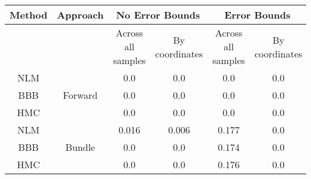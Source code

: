 \documentclass[convert={outext=.png}]{standalone}
\begin{document}
\centering
\label{tab:experimental_results}

\begin{tabular}{c c c c c c}

\hline
\hline
Method & Approach &  \multicolumn{2}{c}{No Error Bounds} & \multicolumn{2}{c}{Error Bounds} \\ \hline
 && Across all samples & By coordinates & Across all samples & By coordinates \\
 NLM & \multirow{3}{*}{Forward} & 0.0 & 0.0 & 0.0 & 0.0 \\
 BBB &  & 0.0 & 0.0 & 0.0 & 0.0 \\
 HMC &  & 0.0 & 0.0 & 0.0 & 0.0 \\
 \hline
 NLM & \multirow{3}{*}{Bundle} & 0.016 & 0.006 & 0.177 & 0.0 \\
 BBB &  & 0.0 & 0.0 & 0.174 & 0.0 \\
 HMC &  & 0.0 & 0.0 & 0.176 & 0.0 \\
\hline
\hline
\end{tabular}
\end{document}
